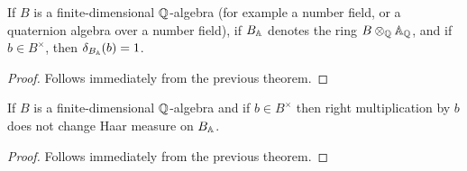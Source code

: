   \begin{corollary}
    \label{NumberField.AdeleRing.units_mem_ringHaarCharacter_ker}
    \leanok
    If $B$ is a finite-dimensional $\mathbb{Q}$-algebra (for example a number field, or a quaternion algebra over a number field),
    if $B_{\mathbb{A}}$ denotes the ring $B\otimes_{\mathbb{Q}}\mathbb{A}_{\mathbb{Q}}$, and if $b\in B^\times$,
    then $\delta_{B_{\mathbb{A}}}(b)=1$.
  \end{corollary}
  \begin{proof}
    Follows immediately from the previous theorem.
  \end{proof}

  \begin{corollary}
    \label{NumberField.AdeleRing.addEquivAddHaarChar_mulRight_unit_eq_one}
    \leanok
    If $B$ is a finite-dimensional $\mathbb{Q}$-algebra and
    if $b\in B^\times$ then right multiplication by $b$
    does not change Haar measure on $B_{\mathbb{A}}$.
  \end{corollary}
  \begin{proof}
    Follows immediately from the previous theorem.
  \end{proof}
